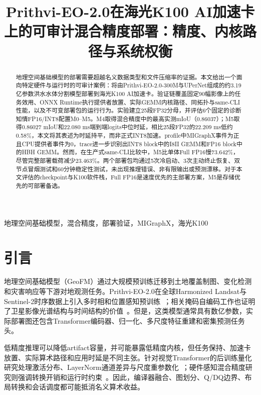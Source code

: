 \documentclass[conference]{IEEEtran}
\begin{document}
\title{Prithvi-EO-2.0在海光K100 AI加速卡上的可审计混合精度部署：精度、内核路径与系统权衡}

\author{
}

\maketitle

\begin{abstract}
地理空间基础模型的部署需要超越名义数据类型和文件压缩率的证据。本文给出一个面向特定硬件与运行时的可审计案例：将由Prithvi-EO-2.0-300M与UPerNet组成的约3.19亿参数洪水水体分割模型部署到海光K100 AI加速卡。验证链覆盖固定90幅影像上的任务效用、ONNX Runtime执行提供者放置、实际GEMM内核路径、同拓扑与same-CLI性能，以及不可变部署包的运行行为。实验建立25段FP32分母，并评估6个固定的诊断知情FP16/INT8配置M0--M5。M4取得混合精度中的最高实测mIoU（0.86037）；M5取得0.86027 mIoU和22.080 ms端到端logits中位时延，相比25段FP32的22.209 ms低约0.58\%，本文将其表述为时延持平，而非正式INT8加速。profile中MIGraphX事件为正且CPU提供者事件为0，trace进一步识别出INT8 block中的I8II GEMM和FP16 block中的HBH GEMM。然而，在生产式same-CLI比较中，M5比单体Full FP16慢73.642\%，尽管完整部署载荷减少23.463\%。两个部署包均通过5次冷启动、3次主动终止恢复、双节点冒烟测试和60分钟稳定性测试，未出现推理错误、非有限输出或预测漂移。对于本文评估的checkpoint与K100软件栈，Full FP16是速度优先的主部署方案，M5是存储优先的可部署备选。
\end{abstract}

\begin{IEEEkeywords}
地理空间基础模型，混合精度，部署验证，MIGraphX，海光K100
\end{IEEEkeywords}

\section{引言}
\label{sec:introduction}

地理空间基础模型（GeoFM）通过大规模预训练迁移到土地覆盖制图、变化检测和灾害响应等下游对地观测任务。Prithvi-EO-2.0在全球Harmonized Landsat与Sentinel-2时序数据上引入多时相和位置感知预训练~\cite{prithvi2024}；相关掩码自编码工作也证明了卫星影像光谱结构与时间结构的价值~\cite{satmae2022}。但是，这类模型通常具有数亿参数，实际部署图还包含Transformer编码器、归一化、多尺度特征重建和密集预测任务头。

低精度推理可以降低artifact容量，并可能暴露低精度内核，但任务保持、加速卡放置、实际算术路径和应用时延是不同主张。针对视觉Transformer的后训练量化研究处理激活分布、LayerNorm通道差异与尺度重参数化~\cite{ptq4vit2022,fqvit2022,repqvit2023}；硬件感知混合精度研究则强调转换开销和运行时约束~\cite{hawqv3}。因此，编译器融合、图划分、Q/DQ边界、布局转换和会话调度都可能抵消名义算术收益。
\end{document}
